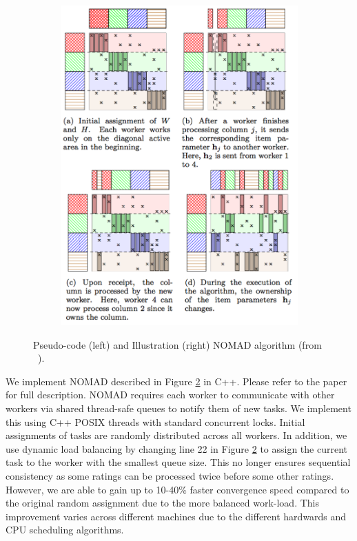 \documentclass{article} %
\begin{document}
\begin{figure}[h]
  \begin{subfigure}[b]{0.5\textwidth}
    \includegraphics[width=\textwidth]{figures/nomad}
    \label{fig:nomad}
  \end{subfigure}
  \vspace{-20pt}
  \caption{Pseudo-code (left) and Illustration (right) NOMAD algorithm (from ~\cite{yun2013nomad}).}\label{fig:nomad}
\end{figure}

We implement NOMAD \cite{yun2013nomad} described in Figure \ref{fig:nomad} in
C++. Please refer to the paper for full description. NOMAD requires each
worker to communicate with other workers via shared thread-safe queues to
notify them of new tasks. We implement this using C++ POSIX threads with
standard concurrent locks. Initial assignments of tasks are randomly
distributed across all workers. In addition, we use dynamic load balancing by
changing line 22 in Figure \ref{fig:nomad} to assign the current task to the
worker with the smallest queue size. This no longer ensures sequential
consistency as some ratings can be processed twice before some other ratings.
However, we are able to gain up to 10-40\% faster convergence speed compared
to the original random assignment due to the more balanced work-load. This
improvement varies across different machines due to the different hardwards
and CPU scheduling algorithms.
\end{document}
